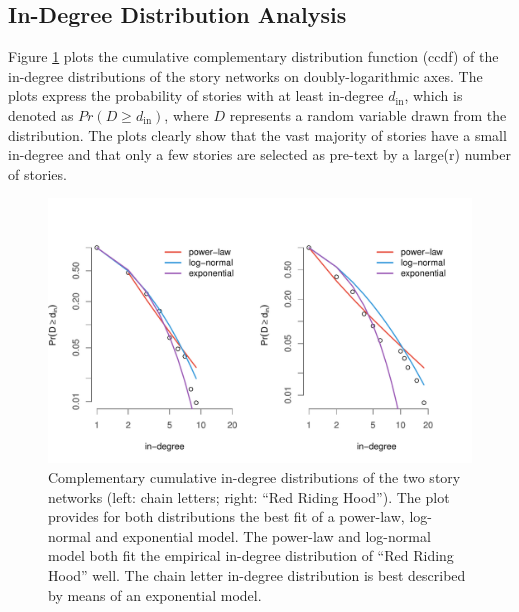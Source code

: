 \subsection{In-Degree Distribution Analysis}

Figure \ref{fig:degree-fits} plots the cumulative complementary distribution function (ccdf) of the in-degree distributions of the story networks on doubly-logarithmic axes. The plots express the probability of stories with at least in-degree $d_{\text{in}}$, which is denoted as $Pr(D \geq d_{\text{in}})$, where $D$ represents a random variable drawn from the distribution. The plots clearly show that the vast majority of stories have a small in-degree and that only a few stories are selected as pre-text by a large(r) number of stories. 

\begin{figure}[t]
\includegraphics[width=\textwidth]{images/degree-fits.pdf}
\caption{Complementary cumulative in-degree distributions of the two story networks (left: chain letters; right: ``Red Riding Hood''). The plot provides for both distributions the best fit of a power-law, log-normal and exponential model. The power-law and log-normal model both fit the empirical in-degree distribution of ``Red Riding Hood'' well. The chain letter in-degree distribution is best described by means of an exponential model.}
\label{fig:degree-fits}
\end{figure}

